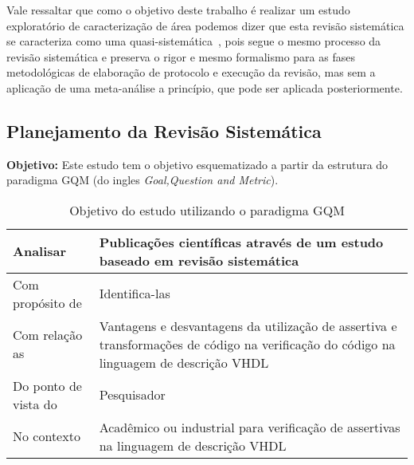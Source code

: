 Vale ressaltar que como o objetivo deste trabalho é realizar um estudo exploratório de caracterização de área podemos dizer que esta revisão sistemática se caracteriza como uma quasi-sistemática~\cite{travassos2008environment}, pois segue o mesmo processo da revisão sistemática e preserva o rigor e mesmo formalismo para as fases metodológicas de elaboração de protocolo e execução da revisão, mas sem a aplicação de uma meta-análise a princípio, que pode ser aplicada posteriormente.

\subsection{Planejamento da Revisão Sistemática}

\textbf{Objetivo:} Este estudo tem o objetivo esquematizado a partir da estrutura do paradigma GQM (do ingles \textit{Goal,Question and Metric})\cite{basili1994experience}.

\begin{table}[h!]
\centering
\label{}
\begin{tabularx}{\textwidth}{|l|X|}
\hline
Analisar & Publicações científicas através de um estudo baseado em revisão sistemática \\ \hline
Com propósito de & Identifica-las \\ \hline
Com relação as & Vantagens e desvantagens da utilização de assertiva e transformações de código na verificação do código na linguagem de descrição VHDL \\ \hline
Do ponto de vista do & Pesquisador \\ \hline
No contexto & Acadêmico ou industrial para verificação de assertivas na linguagem de descrição VHDL \\ \hline
\end{tabularx}
\caption{Objetivo do estudo utilizando o paradigma GQM}
\end{table}

